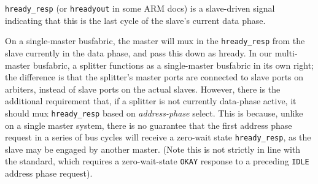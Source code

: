 \documentclass{article}
\begin{document}
\texttt{hready\_resp} (or \texttt{hreadyout} in some ARM docs) is a slave-driven signal indicating that this is the last cycle of the slave's current data phase.

On a single-master busfabric, the master will mux in the \texttt{hready\_resp} from the slave currently in the data phase, and pass this down as hready.  In our multi-master busfabric, a splitter functions as a single-master busfabric in its own right; the difference is that the splitter's master ports are connected to slave ports on arbiters, instead of slave ports on the actual slaves.  However, there is the additional requirement that, if a splitter is not currently data-phase active, it should mux \texttt{hready\_resp} based on \textit{address-phase} select. This is because, unlike on a single master system, there is no guarantee that the first address phase request in a series of bus cycles will receive a zero-wait state \texttt{hready\_resp}, as the slave may be engaged by another master. (Note this is not strictly in line with the standard, which requires a zero-wait-state \texttt{OKAY} response to a preceding \texttt{IDLE} address phase request).
\end{document}
